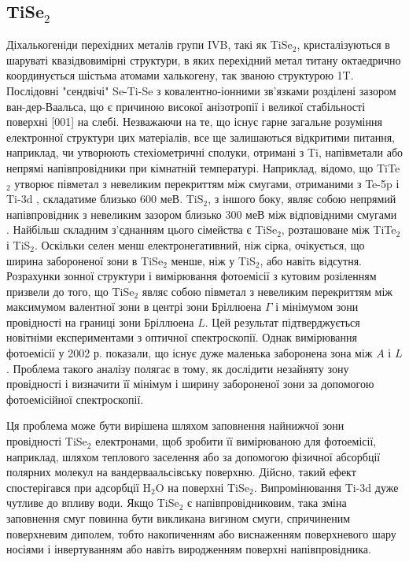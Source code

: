 \subsection{TiSe$_2$}
Діхалькогеніди перехідних металів групи IVB, такі як TiSe$_2$, кристалізуються в шаруваті квазідвовимірні структури, в яких перехідний метал титану октаедрично координується шістьма атомами халькогену, так званою структурою 1T. Послідовні "сендвічі" Se-Ti-Se з ковалентно-іонними зв'язками розділені зазором ван-дер-Ваальса, що є причиною високої анізотропії і великої стабільності поверхні [001] на слебі. Незважаючи на те, що існує гарне загальне розуміння електронної структури цих матеріалів, все ще залишаються відкритими питання, наприклад, чи утворюють стехіометричні сполуки, отримані з Ti, напівметали або непрямі напівпровідники при кімнатній температурі. Наприклад, відомо, що TiTe$_2$ утворює півметал з невеликим перекриттям між смугами, отриманими з Te-5p і Ti-3d \cite{PhysRevB29, PhysRevB54}, складатиме близько 600 меВ. TiS$_2$, з іншого боку, являє собою непрямий напівпровідник з невеликим зазором близько 300 меВ між відповідними смугами \cite{PhysRevB16, PhysRevB21}. Найбільш складним з'єднанням цього сімейства є TiSe$_2$, розташоване між TiTe$_2$ і TiS$_2$. Оскільки селен менш електронегативний, ніж сірка, очікується, що ширина забороненої зони в TiSe$_2$ менше, ніж у TiS$_2$, або навіть відсутня. Розрахунки зонної структури і вимірювання фотоемісії з кутовим розіленням \cite{PhysRevB17,PhysRevL55,SolidStateCommun53,PhysRevB61} призвели до того, що TiSe$_2$ являє собою півметал з невеликим перекриттям між максимумом валентної зони в центрі зони Бріллюена $\Gamma$ і мінімумом зони провідності на границі зони Бріллюена $L$. Цей результат підтверджується новітніми експериментами з оптичної спектроскопії. Однак вимірювання фотоемісії у 2002 р. \cite{PhysRev65,PhyRevLet88} показали, що існує дуже маленька заборонена зона між $A$ і $L$. Проблема такого аналізу полягає в тому, як дослідити незайняту зону провідності і визначити її мінімум і ширину забороненої зони за допомогою фотоемісійної спектроскопії.

Ця проблема може бути вирішена шляхом заповнення найнижчої зони провідності TiSe$_2$ електронами, щоб зробити її вимірюваною для фотоемісії, наприклад,  шляхом теплового заселення або за допомогою фізичної абсорбції полярних молекул на вандерваальсівську поверхню. Дійсно, такий ефект спостерігався при адсорбції H$_2$O на поверхні TiSe$_2$. Випромінювання Ti-3d дуже чутливе до впливу води. Якщо TiSe$_2$ є напівпровідниковим, така зміна заповнення смуг повинна бути викликана вигином смуги, спричиненим поверхневим диполем, тобто накопиченням або виснаженням поверхневого шару носіями і інвертуванням або навіть виродженням поверхні напівпровідника.
